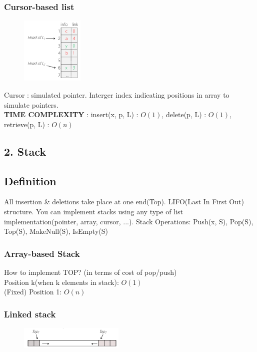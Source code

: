 \begin{section}
\subsubsection*{Cursor-based list}

\begin{figure}
    \includegraphics[width=3cm]{img/cursorbasedlist.png}
\end{figure}

\bigskip
Cursor : simulated pointer. Interger index indicating positions in array to simulate pointers. \\
\textbf{TIME COMPLEXITY} : insert(x, p, L) : $O(1)$, delete(p, L) : $O(1)$, retrieve(p, L) : $O(n)$

\bigskip

\subsection*{2. Stack}

\subsection*{Definition}

All insertion \& deletions take place at one end(Top). LIFO(Last In First Out) structure. You can implement stacks using any type of list implementation(pointer, array, cursor, ...).
\medskip
\noindent Stack Operations: Push(x, S), Pop(S), Top(S), MakeNull(S), IsEmpty(S)

\subsubsection*{Array-based Stack}
How to implement TOP? (in terms of cost of pop/push) \\
Position k(when k elements in stack): $O(1)$ \\ (Fixed) Position 1: $O(n)$

\subsubsection*{Linked stack}

\begin{figure}
    \includegraphics[width=5cm]{img/linkedstack.png}
\end{figure}


\end{section}
